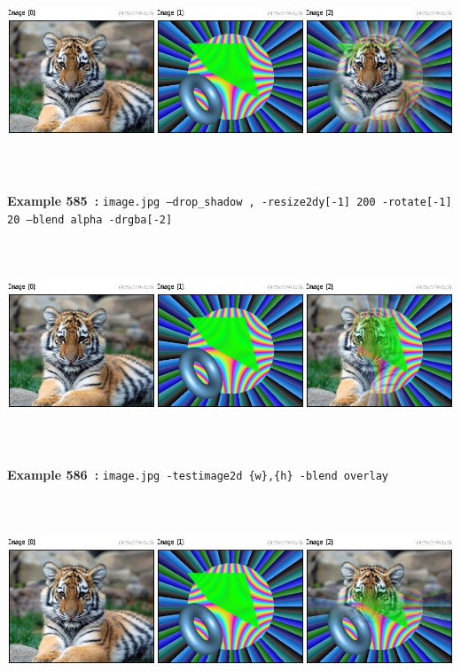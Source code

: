 \documentclass[a4paper,11pt,twoside]{book}
\begin{document}
\begin{center}\includegraphics[keepaspectratio=true,height=7cm,width=\textwidth]{img/gmic_def585.jpg}\\
{\footnotesize \textbf{Example 585~:} \texttt{image.jpg --drop\_shadow , -resize2dy[-1] 200 -rotate[-1] 20 --blend alpha -drgba[-2]}}
\\\includegraphics[keepaspectratio=true,height=7cm,width=\textwidth]{img/gmic_def586.jpg}\\
{\footnotesize \textbf{Example 586~:} \texttt{image.jpg -testimage2d \{w\},\{h\} -blend overlay}}
\\\includegraphics[keepaspectratio=true,height=7cm,width=\textwidth]{img/gmic_def587.jpg}\\

\end{center}
\end{document}
